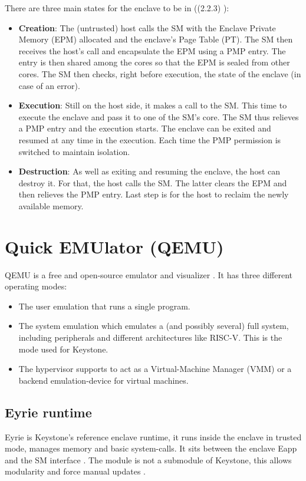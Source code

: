\documentclass[11pt,a4paper]{report}
\begin{document}
There are three main states for the enclave to be in ((2.2.3) \cite{keystone-docs}):
\begin{itemize}
    \item \textbf{Creation}: The (untrusted) host calls the SM with the Enclave Private Memory (EPM) allocated and the enclave's Page Table (PT).
    The SM then receives the host's call and encapsulate the EPM using a PMP entry.
    The entry is then shared among the cores so that the EPM is sealed from other cores.
    The SM then checks, right before execution, the state of the enclave (in case of an error). 

    \item \textbf{Execution}: Still on the host side, it makes a call to the SM. This time to execute the enclave and pass it to one of the SM's core.
    The SM thus relieves a PMP entry and the execution starts.
    The enclave can be exited and resumed at any time in the execution. Each time the PMP permission is switched to maintain isolation.
    
    \item \textbf{Destruction}: As well as exiting and resuming the enclave, the host can destroy it.
    For that, the host calls the SM. The latter clears the EPM and then relieves the PMP entry.
    Last step is for the host to reclaim the newly available memory. 
     
\end{itemize}

\section{Quick EMUlator (QEMU)}
\label{sub:qemu}
QEMU is a free and open-source emulator and visualizer \cite{qemu-website}. 
It has three different operating modes:
\begin{itemize}
    \item The user emulation that runs a single program.
    \item The system emulation which emulates a (and possibly several) full system, including peripherals and different architectures like RISC-V. 
    This is the mode used for Keystone. 
    \item The hypervisor supports to act as a Virtual-Machine Manager (VMM) or a backend emulation-device for virtual machines.
\end{itemize} 

\subsection{Eyrie runtime}
\label{sub:eyrie}
Eyrie is Keystone’s reference enclave runtime, it runs inside the enclave in trusted mode, manages memory and basic system-calls.
It sits between the enclave Eapp and the SM interface \cite{Eyrie, review-keystone}.
The module is not a submodule of Keystone, this allows modularity and force manual updates \cite{keystone-docs}. 
\end{document}
